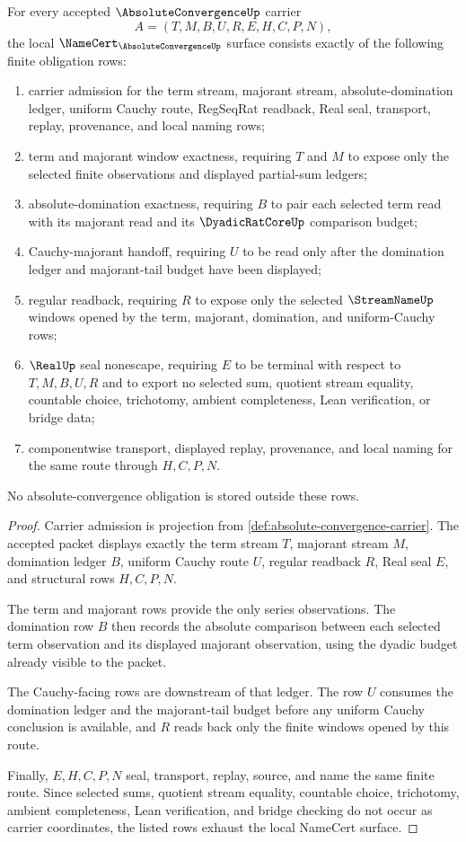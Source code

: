 \begin{theorem}\label{thm:absolute-convergence-namecert-obligations}
For every accepted $\AbsoluteConvergenceUp$ carrier
$$
A=(T,M,B,U,R,E,H,C,P,N),
$$
the local $\NameCert_{\AbsoluteConvergenceUp}$ surface consists exactly of the following finite obligation rows:
\begin{enumerate}
\item carrier admission for the term stream, majorant stream, absolute-domination ledger, uniform Cauchy route, RegSeqRat readback, Real seal, transport, replay, provenance, and local naming rows;
\item term and majorant window exactness, requiring $T$ and $M$ to expose only the selected finite observations and displayed partial-sum ledgers;
\item absolute-domination exactness, requiring $B$ to pair each selected term read with its majorant read and its $\DyadicRatCoreUp$ comparison budget;
\item Cauchy-majorant handoff, requiring $U$ to be read only after the domination ledger and majorant-tail budget have been displayed;
\item regular readback, requiring $R$ to expose only the selected $\StreamNameUp$ windows opened by the term, majorant, domination, and uniform-Cauchy rows;
\item $\RealUp$ seal nonescape, requiring $E$ to be terminal with respect to $T,M,B,U,R$ and to export no selected sum, quotient stream equality, countable choice, trichotomy, ambient completeness, Lean verification, or bridge data;
\item componentwise transport, displayed replay, provenance, and local naming for the same route through $H,C,P,N$.
\end{enumerate}
No absolute-convergence obligation is stored outside these rows.
\end{theorem}
\begin{proof}
Carrier admission is projection from \autoref{def:absolute-convergence-carrier}. The accepted packet displays exactly the term stream $T$, majorant stream $M$, domination ledger $B$, uniform Cauchy route $U$, regular readback $R$, Real seal $E$, and structural rows $H,C,P,N$.

The term and majorant rows provide the only series observations. The domination row $B$ then records the absolute comparison between each selected term observation and its displayed majorant observation, using the dyadic budget already visible to the packet.

The Cauchy-facing rows are downstream of that ledger. The row $U$ consumes the domination ledger and the majorant-tail budget before any uniform Cauchy conclusion is available, and $R$ reads back only the finite windows opened by this route.

Finally, $E,H,C,P,N$ seal, transport, replay, source, and name the same finite route. Since selected sums, quotient stream equality, countable choice, trichotomy, ambient completeness, Lean verification, and bridge checking do not occur as carrier coordinates, the listed rows exhaust the local NameCert surface.
\end{proof}
